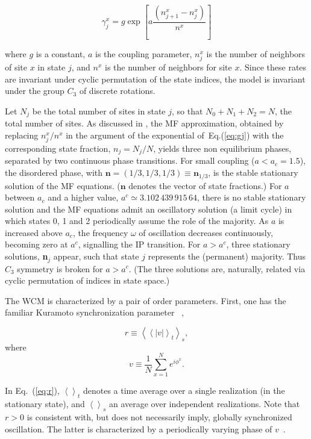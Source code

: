 \begin{equation}
\label{eq:gj}
\gamma^x_j = g \exp \left[ a\frac {\left( n^x_{j+1} - n^x_j \right)} {n^x} \right]
\end{equation}

\noindent where $g$ is a constant, $a$ is the coupling parameter, $n^x_j$ is the number of neighbors of site $x$ in state $j$, and
$n^x$ is the number of neighbors for site $x$. Since these rates are invariant under cyclic permutation of the state indices, the model
is invariant under the group $C_3$ of discrete rotations.

Let $N_j$ be the total number of sites in state $j$, so that $N_0 +N_1 +N_2 = N$, the total number of sites. As discussed in
\cite{assis2011infinite}, the MF approximation, obtained by replacing $n^x_j/n^x$ in the argument of the exponential
of~Eq.(\ref{eq:gj}) with the corresponding state fraction, $n_j = N_j/N$, yields three non equilibrium phases, separated by two
continuous phase transitions. For small coupling ($a < a_c = 1.5$), the disordered phase, with $\textbf{n}=(1/3,1/3,1/3) \equiv
\textbf{n}_{1/3}$, is the stable stationary solution of the MF equations. ($\textbf{n}$ denotes the vector of state fractions.) For $a$
between $a_c$ and a higher value, $a^c\simeq 3.102\, 439\, 915\, 64$, there is no stable stationary solution and the MF equations admit
an oscillatory solution (a limit cycle) in which states 0, 1 and 2 periodically assume the role of the majority. As $a$ is increased
above $a_c$, the frequency $\omega$ of oscillation decreases continuously, becoming zero at $a^c$, signalling the IP transition.  For
$a> a^c$, three stationary solutions, \textbf{n}$_j$ appear, such that state $j$ represents the (permanent) majority. Thus $C_3$
symmetry is broken for $a > a^c$. (The three solutions are, naturally, related via cyclic permutation of indices in state space.) 

The WCM is characterized by a pair of order parameters. First, one has the familiar Kuramoto synchronization parameter
~\cite{Kuramoto84,Strogatz00,Wood06a},

\begin{equation}
    r \equiv \left<\left< |v| \right>_t\right>_s,
    \label{eq:r}
\end{equation}
\noindent where
\begin{equation}
    v \equiv \frac{1}{N} \sum^{N}_{x=1} e^{i\phi^x}.
    \label{eq:v}
\end{equation} 

\noindent In Eq.~(\ref{eq:r}),  $\left< \right>_t$ denotes a time average over a single realization (in the stationary state), and
$\left< \right>_s$ an average over independent realizations. Note that $r > 0$ is consistent with, but does not necessarily imply,
globally synchronized oscillation. The latter is characterized by a periodically varying phase of
$v$~\cite{Kuramoto92a,Ohta08,ShinomotoKuramoto86,Rozenblit11}.

